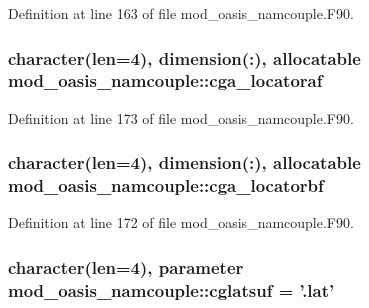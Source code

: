 Definition at line 163 of file mod\+\_\+oasis\+\_\+namcouple.\+F90.

\hypertarget{classmod__oasis__namcouple_a6f4080d45f0b9be5a0466967f535b83b}{
\subsubsection[{cga\+\_\+locatoraf}]{\setlength{\rightskip}{0pt plus 5cm}character(len=4), dimension(\+:), allocatable mod\+\_\+oasis\+\_\+namcouple\+::cga\+\_\+locatoraf\hspace{0.3cm}{\ttfamily [private]}}}\label{classmod__oasis__namcouple_a6f4080d45f0b9be5a0466967f535b83b}


Definition at line 173 of file mod\+\_\+oasis\+\_\+namcouple.\+F90.

\hypertarget{classmod__oasis__namcouple_ac22155599e9b49d57514dd1f7dc9928a}{
\subsubsection[{cga\+\_\+locatorbf}]{\setlength{\rightskip}{0pt plus 5cm}character(len=4), dimension(\+:), allocatable mod\+\_\+oasis\+\_\+namcouple\+::cga\+\_\+locatorbf\hspace{0.3cm}{\ttfamily [private]}}}\label{classmod__oasis__namcouple_ac22155599e9b49d57514dd1f7dc9928a}


Definition at line 172 of file mod\+\_\+oasis\+\_\+namcouple.\+F90.

\hypertarget{classmod__oasis__namcouple_a2036218f05c62fc672bd07ece34f26db}{
\subsubsection[{cglatsuf}]{\setlength{\rightskip}{0pt plus 5cm}character(len=4), parameter mod\+\_\+oasis\+\_\+namcouple\+::cglatsuf = '.lat'\hspace{0.3cm}{\ttfamily [private]}}}\label{classmod__oasis__namcouple_a2036218f05c62fc672bd07ece34f26db}


